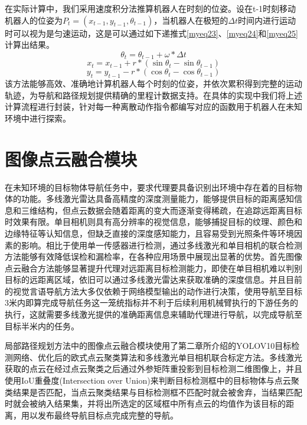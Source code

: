 在实际计算中，我们采用速度积分法推算机器人在时刻的位姿。设在t-1时刻移动机器人的位姿为${P_t} = \left( {{x_{t - 1}},{y_{t - 1}},{\theta _{t - 1}}} \right)$，当机器人在极短的$\Delta t$时间内进行运动时可以视为是匀速运动，这是可以通过如下递推式\eqref{myeq23}、\eqref{myeq24}和\eqref{myeq25}计算出结果。
\begin{equation}
{\theta _t} = {\theta _{t - 1}} + \omega  * \Delta t
    \label{myeq23}
\end{equation}
\begin{equation}
    {x_t} = {x_{t - 1}} + r * \left( {\sin {\theta _t} - \sin {\theta _{t - 1}}} \right)
    \label{myeq24}
\end{equation}
\begin{equation}
{y_t} = {y_{t - 1}} - r * \left( {\cos {\theta _t} - \cos {\theta _{t - 1}}} \right)
    \label{myeq25}
\end{equation}
该方法能够高效、准确地计算机器人每个时刻的位姿，并依次累积得到完整的运动轨迹，为导航和路径规划提供精确的里程计数据支持。在具体的实现中我们将上述计算流程进行封装，针对每一种离散动作指令都编写对应的函数用于机器人在未知环境中进行探索。

\section{图像点云融合模块}
在未知环境的目标物体导航任务中，要求代理要具备识别出环境中存在着的目标物体的功能。多线激光雷达具备高精度的深度测量能力，能够提供目标的距离感知信息和三维结构，但点云数据会随着距离的变大而逐渐变得稀疏，在追踪远距离目标时效果有限。单目相机则具有高分辨率的视觉信息，能够捕捉目标的纹理、颜色和边缘特征等认知信息，但缺乏直接的深度感知能力，且容易受到光照条件等环境因素的影响。相比于使用单一传感器进行检测，通过多线激光和单目相机的联合检测方法能够有效降低误检和漏检率，在各种应用场景中展现出显著的优势。首先图像点云融合方法能够显著提升代理对远距离目标检测能力，即使在单目相机难以判别目标的远距离区域，依旧可以通过多线激光雷达来获取准确的深度信息。并且目前的视觉言语导航方法大多仅依赖于网络模型输出的动作进行决策，使用导航至目标3米内即算完成导航任务这一笼统指标并不利于后续利用机械臂执行的下游任务的执行，这就需要多线激光提供的准确距离信息来辅助代理进行导航，以完成导航至目标半米内的任务。

局部路径规划方法中的图像点云融合模块使用了第二章所介绍的YOLOV10目标检测网络、优化后的欧式点云聚类算法和多线激光单目相机联合标定方法。多线激光获取的点云在经过点云聚类之后通过外参矩阵重投影到目标检测二维图像上，并且使用IoU重叠度(Intersection over Union)来判断目标检测框中的目标物体与点云聚类结果是否匹配，当点云聚类结果与目标检测框不匹配时就会被舍弃，当结果匹配时就会被纳入结果集，并将出所选定的区域框中所有点云的均值作为该目标的距离，用以发布最终导航目标点完成完整的导航。

